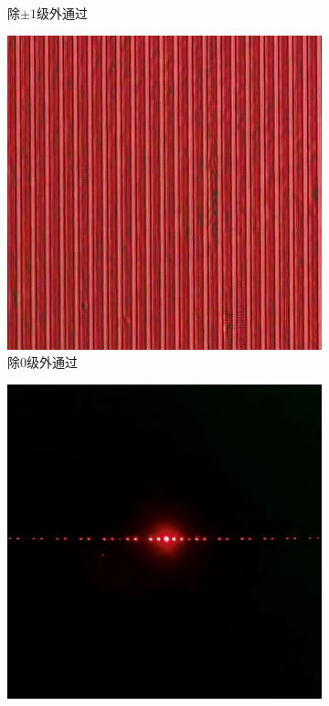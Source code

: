 \documentclass[a4paper]{article}
\begin{document}
\begin{figure}[H]
\begin{subfigure}[t]{0.3\textwidth}
        \caption{除$\pm1$级外通过}
        \label{fig3-4-4}
    \end{subfigure}
    \begin{subfigure}[t]{0.3\textwidth}
        \centering
        \includegraphics[width=\textwidth]{img2-done/3-5.JPG}
        \caption{除$0$级外通过}
        \label{fig3-4-5}
    \end{subfigure}
    \begin{subfigure}[t]{0.3\textwidth}
        \centering
        \includegraphics[width=\textwidth]{phone-img/1.jpg}

\end{subfigure}
\end{figure}
\end{document}
